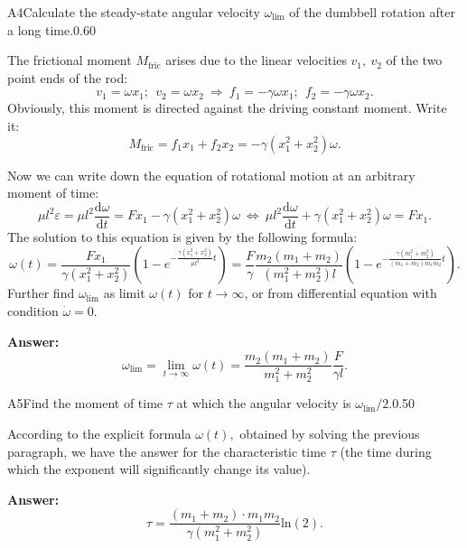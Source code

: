 \documentclass[11pt,a4paper]{article}
\begin{document}
\begin{solcard}{A4}{Calculate the steady-state angular velocity $\omega_{\text{lim}}$ of the dumbbell rotation after a long time.}{0.60}

The frictional moment $M_{\text{fric}}$ arises due to the linear velocities $v_1,~v_2$ of the two point ends of the rod: $$v_1 = \omega x_1;~~v_2 = \omega x_2~\Rightarrow~f_1 = -\gamma\omega x_1;~~f_2 = -\gamma \omega x_2.$$Obviously, this moment is directed against the driving constant moment. Write it: $$M_{\text{fric}} = f_1x_1 + f_2x_2 = -\gamma(x_1^2 + x_2^2)\omega.$$


Now we can write down the equation of rotational motion at an arbitrary moment of time: $$\mu l^2 \varepsilon = \mu l^2 \frac{\mathrm{d}\omega}{\mathrm{d}t} = Fx_1 - \gamma(x_1^2 + x_2^2)\omega~\Leftrightarrow~\mu l^2 \frac{\mathrm{d}\omega}{\mathrm{d}t} + \gamma(x_1^2 + x_2^2)\omega = Fx_1.$$The solution to this equation is given by the following formula: $$\omega(t) = \frac{Fx_1}{\gamma(x_1^2 + x_2^2)}\left(1 - e^{-\frac{\gamma(x_1^2 + x_2^2)}{\mu l^2}t}\right) = \frac{F}{\gamma}\frac{m_2(m_1 + m_2)}{(m_1^2 + m_2^2)l}\left(1 - e^{-\frac{\gamma (m_1^2 + m_2^2)}{(m_1 + m_2)m_1m_2}t}\right).$$Further find $\omega_{\text{lim}}$ as limit $\omega(t)$ for $t \rightarrow \infty$, or from differential equation with condition $\dot{\omega} = 0.$

\par\smallskip\noindent\textbf{Answer:} $$\omega_{\text{lim}} = \lim_{t\rightarrow \infty} \omega(t) = \frac{m_2(m_1 + m_2)}{m_1^2 + m_2^2}\frac{F}{\gamma l}.$$
\end{solcard}

\begin{solcard}{A5}{Find the moment of time $\tau$ at which the angular velocity is $\omega_{\text{lim}}/2$.}{0.50}

According to the explicit formula $\omega(t),$ obtained by solving the previous paragraph, we have the answer for the characteristic time $\tau$ (the time during which the exponent will significantly change its value).

\par\smallskip\noindent\textbf{Answer:} $$\tau =  \dfrac{(m_1+m_2) \cdot m_1 m_2}{\gamma (m_1^2+m_2^2)}\mathrm{ln}(2).$$
\end{solcard}
\end{document}
